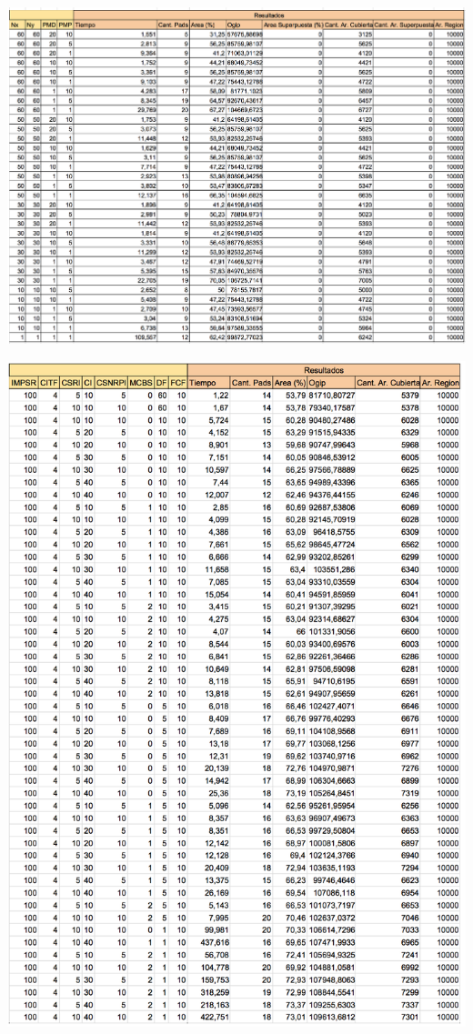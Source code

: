 \begin{center}
\includegraphics[width=1\textwidth]{imagenes/GML_0G100x100_pocos}
\end{center}

\begin{center}
\includegraphics[width=1\textwidth]{imagenes/0G100x100_pocos_V1}
\end{center}

